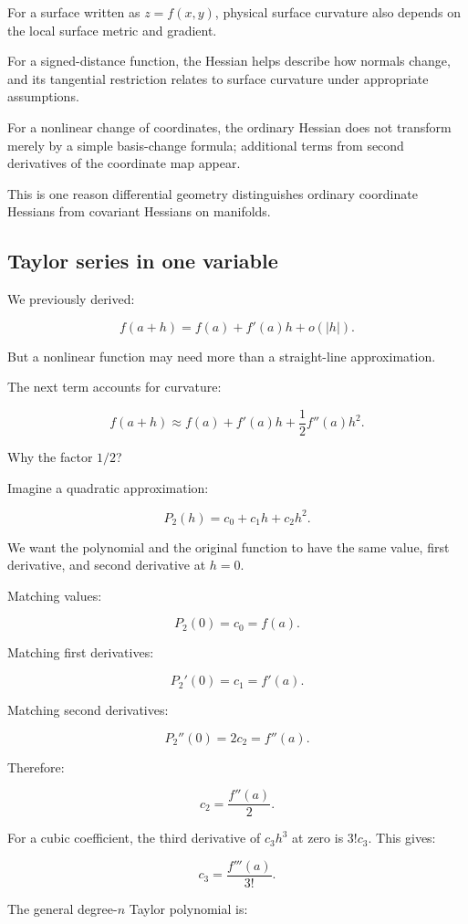 For a surface written as \(z=f(x,y)\), physical surface curvature also depends on the local surface metric and gradient.

For a signed-distance function, the Hessian helps describe how normals change, and its tangential restriction relates to surface curvature under appropriate assumptions.

For a nonlinear change of coordinates, the ordinary Hessian does not transform merely by a simple basis-change formula; additional terms from second derivatives of the coordinate map appear.

This is one reason differential geometry distinguishes ordinary coordinate Hessians from covariant Hessians on manifolds.

\subsection{Taylor series in one variable}\label{02-foundations-ii-ch021-taylor-series-in-one-variable}

We previously derived:

\[
f(a+h)=f(a)+f'(a)h+o(|h|).
\]

But a nonlinear function may need more than a straight-line approximation.

The next term accounts for curvature:

\[
f(a+h)\approx f(a)+f'(a)h+\frac12f''(a)h^2.
\]

Why the factor \(1/2\)?

Imagine a quadratic approximation:

\[
P_2(h)=c_0+c_1h+c_2h^2.
\]

We want the polynomial and the original function to have the same value, first derivative, and second derivative at \(h=0\).

Matching values:

\[
P_2(0)=c_0=f(a).
\]

Matching first derivatives:

\[
P_2'(0)=c_1=f'(a).
\]

Matching second derivatives:

\[
P_2''(0)=2c_2=f''(a).
\]

Therefore:

\[
c_2=\frac{f''(a)}2.
\]

For a cubic coefficient, the third derivative of \(c_3h^3\) at zero is \(3!c_3\). This gives:

\[
c_3=\frac{f'''(a)}{3!}.
\]

The general degree-\(n\) Taylor polynomial is:

